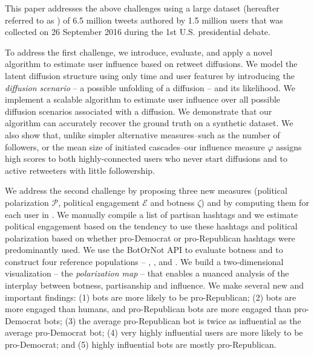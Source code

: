 This paper addresses the above challenges using a large dataset (hereafter referred to as \debate) of 6.5 million tweets authored by 1.5 million users that was collected on 26 September 2016 during the 1st U.S. presidential debate.

To address the first challenge, we introduce, evaluate, and apply a novel algorithm to estimate user influence based on retweet diffusions.
We model the latent diffusion structure using only time and user features by introducing the \emph{diffusion scenario} -- a possible unfolding of a diffusion -- and its likelihood.
We implement a scalable algorithm to estimate user influence over all possible diffusion scenarios associated with a diffusion.
We demonstrate that our algorithm can accurately recover the ground truth on a synthetic dataset.
We also show that, unlike simpler alternative measures--such as the number of followers, or the mean size of initiated cascades--our influence measure $\varphi$ assigns high scores to both highly-connected users who never start diffusions and to active retweeters with little followership.

We address the second challenge by proposing three new measures (political polarization $\mathcal{P}$, political engagement $\mathcal{E}$ and botness $\zeta$) and by computing them for each user in \debate.
We manually compile a list of partisan hashtags and we estimate political engagement based on the tendency to use these hashtags and political polarization based on whether pro-Democrat or pro-Republican hashtags were predominantly used.
We use the BotOrNot API to evaluate botness and to construct four reference populations -- \Human, \Protected, \Suspended and \Bot.
We build a two-dimensional visualization -- the \emph{polarization map} -- that enables a nuanced analysis of the interplay between botness, partisanship and influence.
We make several new and important findings: 
(1) bots are more likely to be pro-Republican; 
(2) bots are more engaged than humans, and pro-Republican bots are more engaged than pro-Democrat bots; 
(3) the average pro-Republican bot is twice as influential as the average pro-Democrat bot; 
(4) very highly influential users are more likely to be pro-Democrat; and 
(5) highly influential bots are mostly pro-Republican.

